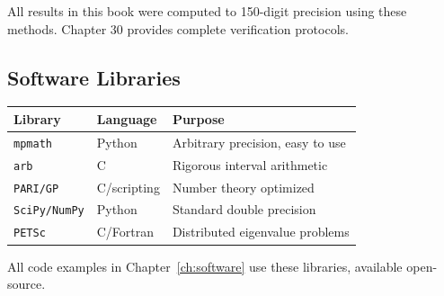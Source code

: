 All results in this book were computed to 150-digit precision using these methods. Chapter 30 provides complete verification protocols.

\subsection{Software Libraries}

\begin{center}
\begin{tabular}{|l|l|l|}
\hline
\textbf{Library} & \textbf{Language} & \textbf{Purpose} \\
\hline
\texttt{mpmath} & Python & Arbitrary precision, easy to use \\
\texttt{arb} & C & Rigorous interval arithmetic \\
\texttt{PARI/GP} & C/scripting & Number theory optimized \\
\texttt{SciPy/NumPy} & Python & Standard double precision \\
\texttt{PETSc} & C/Fortran & Distributed eigenvalue problems \\
\hline
\end{tabular}
\end{center}

All code examples in Chapter~\ref{ch:software} use these libraries, available open-source.
